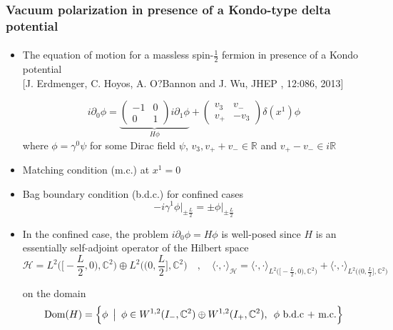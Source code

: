 \documentclass[english]{beamer}
\begin{document}
\begin{frame}[shrink=30]
\frametitle{\small{Vacuum polarization in presence of a Kondo-type delta potential}}
\framesubtitle{}
\begin{itemize}
%
\item<1-> 
The equation of motion for a massless spin-$\frac 1 2$ fermion in presence of a Kondo potential \\
\tiny\color{blue}[J. Erdmenger, C. Hoyos, A. O?Bannon and J. Wu, JHEP
, 12:086, 2013]\color{black}\normalsize

\begin{equation*}
i \partial_0 \phi = 
\underbrace{\begin{pmatrix} 
-1 & 0 \\
0 & 1 
\end{pmatrix} i \partial_1 \phi }_{H\phi}+
\begin{pmatrix}
v_3 & v_- \\
v_+ & -v_3
\end{pmatrix} \delta(x^1) \phi
\end{equation*}
where $\phi = \gamma^0\psi$ for some Dirac field $\psi$,  $v_3, v_+ + v_- \in \mathbb{R}$ and $ v_+ - v_-\in i \mathbb{R}$
%
\item<2-> Matching condition (m.c.) at $x^1 = 0$ 
%
\item<3-> Bag boundary condition (b.d.c.) for confined cases 
\begin{equation*}
- i\gamma^1 \phi \Big\vert_{\pm \frac{L}{2}} = \pm \phi \Big\vert_{\pm \frac{L}{2}}
\end{equation*}

%
\item<4-> In the confined case, the problem $i\partial_0\phi = H\phi$ is well-posed since $H$ is an essentially self-adjoint operator of the Hilbert space
\begin{equation*}
\mathcal{H} = L^{2}\Big(\big[-\frac L 2, 0\big), \mathbb{C}^2\Big) \oplus L^{2}\Big(\big(0,\frac L 2\big], \mathbb{C}^2\Big) 
\quad,\quad
\langle \cdot, \cdot\rangle_{\mathcal{H} } = \langle \cdot, \cdot\rangle_{L^{2}\big(\big[-\frac L 2, 0\big), \mathbb{C}^2\big)} +\langle \cdot, \cdot\rangle_{L^{2}\big(\big(0,\frac L 2\big], \mathbb{C}^2\big)}
\end{equation*}

 on the domain
\begin{equation*}
\mathrm{Dom}(H) = \Big \{\phi \enskip \big\vert \enskip \phi \in W^{1,2}(I_-, \mathbb{C}^2) \oplus W^{1,2}(I_+, \mathbb{C}^2), \enskip \phi \textrm{ b.d.c + m.c.} \Big \}
\end{equation*} 


\end{itemize}
\end{frame}
\end{document}
